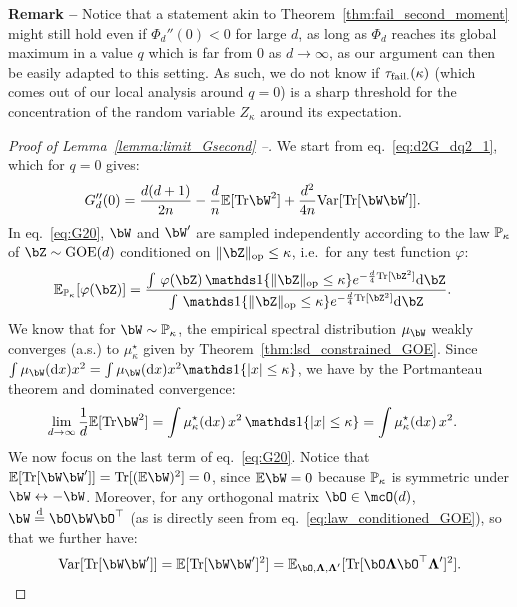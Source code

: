 \myskip 
\textbf{Remark --} Notice that a statement akin to Theorem~\ref{thm:fail_second_moment} might still hold even if $\Phi_d''(0) < 0$ for large $d$, as long 
as $\Phi_d$ reaches its global maximum in a value $q$ which is far from $0$ as $d \to \infty$, as our 
argument can then be easily adapted to this setting.
As such, we do not know if $\tau_{\rm fail.}(\kappa)$ (which 
comes out of our local analysis around $q = 0$) is a sharp threshold for the concentration of the random variable $Z_\kappa$ around its expectation.

\myskip
\begin{proof}[Proof of Lemma~\ref{lemma:limit_Gsecond} --]
We start from eq.~\eqref{eq:d2G_dq2_1}, which for $q = 0$ gives:
\begin{align}\label{eq:G20}
    G_d''(0) &= \frac{d(d+1)}{2n} - \frac{d}{n} \EE[\Tr \bW^2] + \frac{d^2}{4n} \textrm{Var}[\Tr[\bW \bW']].
\end{align}
In eq.~\eqref{eq:G20}, $\bW$ and $\bW'$ are sampled independently according to the law 
$\mathbb{P}_\kappa$ of $\bZ \sim \GOE(d)$ conditioned on $\|\bZ\|_\op \leq \kappa$, i.e.\
for any test function $\varphi$:
\begin{align}\label{eq:law_conditioned_GOE}
    \EE_{\bbP_\kappa}[\varphi(\bZ)] &= \frac{\int \, \varphi(\bZ) \, \indi\{\|\bZ\|_\op \leq \kappa\} e^{-\frac{d}{4} \Tr[\bZ^2]} \rd \bZ}{\int \, \indi\{\|\bZ\|_\op \leq \kappa\} e^{-\frac{d}{4} \Tr[\bZ^2]} \rd \bZ}.
\end{align}
We know that for $\bW \sim \bbP_\kappa$, the empirical spectral distribution $\mu_\bW$ weakly converges (a.s.) to $\mu_\kappa^\star$ given by Theorem~\ref{thm:lsd_constrained_GOE}.
Since $\int \mu_\bW(\rd x) x^2 = \int \mu_\bW(\rd x) x^2 \indi\{|x| \leq \kappa\}$, we have by the Portmanteau theorem 
and dominated convergence: 
\begin{align}\label{eq:term_1_G20}
    \lim_{d \to \infty} \frac{1}{d}\EE[\Tr \bW^2] &= \int \mu_\kappa^\star(\rd x) \, x^2 \, \indi\{|x| \leq \kappa\} = \int \mu_\kappa^\star(\rd x) \, x^2.
\end{align}
We now focus on the last term of eq.~\eqref{eq:G20}.
Notice that $\EE[\Tr[\bW \bW']] = \Tr[(\EE \bW)^2] = 0$, since $\EE \bW = 0$ because $\mathbb{P}_\kappa$ is symmetric under $\bW \leftrightarrow - \bW$.
Moreover, for any orthogonal matrix $\bO \in \mcO(d)$, $\bW \deq \bO \bW \bO^\T$ (as is directly seen from eq.~\eqref{eq:law_conditioned_GOE}), so that we further have:
\begin{align}\label{eq:variance_Haar_measure}
   \textrm{Var}[\Tr[\bW \bW']] = \EE[\Tr[\bW \bW']^2]= \EE_{\bO, \bLambda, \bLambda'}[\Tr[\bO \bLambda \bO^\T \bLambda']^2].

\end{align}
\end{proof}
